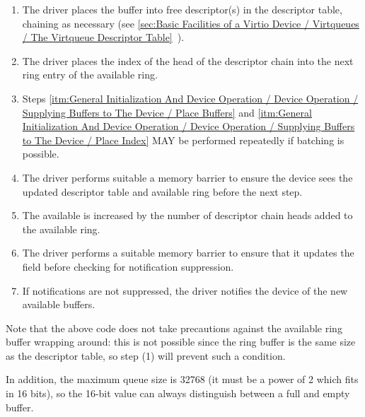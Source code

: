 \begin{enumerate}
\item\label{itm:General Initialization And Device Operation / Device Operation / Supplying Buffers to The Device / Place Buffers} The driver places the buffer into free descriptor(s) in the
   descriptor table, chaining as necessary (see \ref{sec:Basic Facilities of a Virtio Device / Virtqueues / The Virtqueue Descriptor Table}~).

\item\label{itm:General Initialization And Device Operation / Device Operation / Supplying Buffers to The Device / Place Index} The driver places the index of the head of the descriptor chain
   into the next ring entry of the available ring.

\item Steps \ref{itm:General Initialization And Device Operation / Device Operation / Supplying Buffers to The Device / Place Buffers} and \ref{itm:General Initialization And Device Operation / Device Operation / Supplying Buffers to The Device / Place Index} MAY be performed repeatedly if batching
  is possible.

\item The driver performs suitable a memory barrier to ensure the device sees
  the updated descriptor table and available ring before the next
  step.

\item The available  is increased by the number of
  descriptor chain heads added to the available ring.

\item The driver performs a suitable memory barrier to ensure that it updates
  the  field before checking for notification suppression.

\item If notifications are not suppressed, the driver notifies the device
    of the new available buffers.
\end{enumerate}

Note that the above code does not take precautions against the
available ring buffer wrapping around: this is not possible since
the ring buffer is the same size as the descriptor table, so step
(1) will prevent such a condition.

In addition, the maximum queue size is 32768 (it must be a power
of 2 which fits in 16 bits), so the 16-bit  value can always
distinguish between a full and empty buffer.

